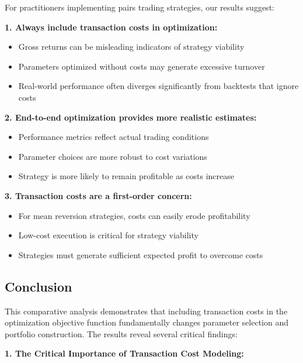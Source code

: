 For practitioners implementing pairs trading strategies, our results suggest:

\textbf{1. Always include transaction costs in optimization:}
\begin{itemize}
    \item Gross returns can be misleading indicators of strategy viability
    \item Parameters optimized without costs may generate excessive turnover
    \item Real-world performance often diverges significantly from backtests that ignore costs
\end{itemize}

\textbf{2. End-to-end optimization provides more realistic estimates:}
\begin{itemize}
    \item Performance metrics reflect actual trading conditions
    \item Parameter choices are more robust to cost variations
    \item Strategy is more likely to remain profitable as costs increase
\end{itemize}

\textbf{3. Transaction costs are a first-order concern:}
\begin{itemize}
    \item For mean reversion strategies, costs can easily erode profitability
    \item Low-cost execution is critical for strategy viability
    \item Strategies must generate sufficient expected profit to overcome costs
\end{itemize}


\subsection{Conclusion}

This comparative analysis demonstrates that including transaction costs in the optimization objective function fundamentally changes parameter selection and portfolio construction. The results reveal several critical findings:

\textbf{1. The Critical Importance of Transaction Cost Modeling:}

